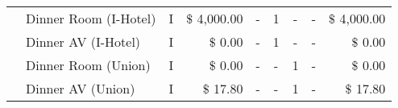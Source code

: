 \begin{tabular}{|clcrccccr|}
     & Dinner Room (I-Hotel)     & I                         & $\$$ 4,000.00             &     -                     &         1                &         -                 &         -                 & $\$$ 4,000.00             \\ 
     & Dinner AV (I-Hotel)       & I                         & $\$$ 0.00                 &      -                    &          1               &          -                &          -                & $\$$ 0.00                 \\
     & Dinner Room (Union)       & I                         & $\$$ 0.00                 &     -                     &         -                &         1                 &         -                 & $\$$ 0.00                 \\ 
     & Dinner AV (Union)         & I                         & $\$$ 17.80                &      -                    &          -               &        1                  &          -                & $\$$ 17.80                \\ \hline  
     

\end{tabular}
